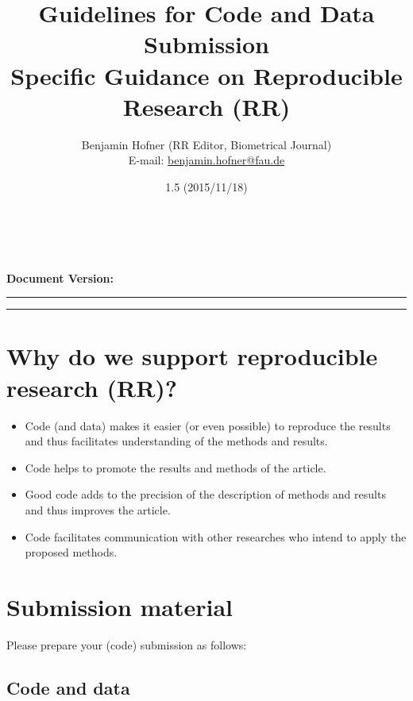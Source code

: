 \documentclass[12pt,a4paper]{article}
\title{\LARGE Guidelines for Code and Data Submission\\[0.2em]
  \large Specific Guidance on Reproducible Research (RR)}
\author{Benjamin Hofner (RR Editor, Biometrical Journal)\\
  E-mail: \href{mailto:benjamin.hofner@fau.de}{benjamin.hofner@fau.de}}
\date{1.5 (2015/11/18)}
\makeatletter
\renewcommand{\maketitle}{\bgroup\setlength{\parindent}{0pt}
  \begin{flushleft}
    \vspace*{2cm}
    \textbf{\Large \@title}\\[1em]

    \@author\\[0.5em]

    \textbf{Document Version:} \@date
    \vspace{2em}
  \end{flushleft}\egroup
}
\makeatother
\begin{document}
\maketitle

\hrule

\tableofcontents

\vspace{2em}
\hrule
\vspace{0.5cm}

\setlength{\parskip}{0.2em}

\section*{Why do we support reproducible research (RR)?}
\begin{itemize}
\item Code (and data) makes it easier (or even possible) to reproduce the results
  and thus facilitates understanding of the methods and results.
\item Code helps to promote the results and methods of the article.
\item Good code adds to the precision of the description of methods and results
  and thus improves the article.
\item Code facilitates communication with other researches who intend to apply
  the proposed methods.
\end{itemize}

\newpage
\setcounter{section}{0}

\section{Submission material}

Please prepare your (code) submission as follows:

\subsection{Code and data}
\end{document}
